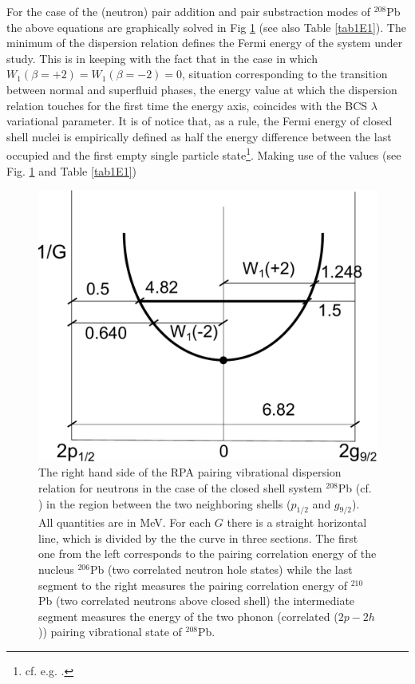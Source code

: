 For the case of the (neutron) pair addition and pair substraction modes of $^{208}$Pb the above equations are  graphically solved in Fig \ref{fig1E1} (see also Table \ref{tab1E1}). The minimum of the dispersion relation defines the Fermi energy of the system under study. This is in keeping with the fact that in the case in which $W_1 (\beta=+2)=W_1(\beta=-2)=0$, situation corresponding to the  transition between normal and superfluid phases, the energy value at which the dispersion relation touches for the first time the energy axis, coincides with the BCS $\lambda$ variational parameter. It is of notice that, as a rule, the Fermi energy of closed shell nuclei is empirically defined as half the energy difference between the last occupied and the first empty single particle state\footnote{cf. e.g. \cite{Mahaux:85}.}. Making use of the values (see Fig. \ref{fig1E1} and Table \ref{tab1E1})
  \begin{figure}
  \centerline{\includegraphics*[width=\textwidth,angle=0]{nutshell/figs/dispersion.pdf}}
  \caption{The right hand side of the RPA pairing vibrational dispersion relation for neutrons in the case of the closed shell system $^{208}$Pb (cf. \cite{Bes:66}) in the region between the two neighboring shells ($p_{1/2}$ and $g_{9/2}$). All quantities are in MeV. For each $G$ there is a straight horizontal line, which is divided by the the curve in three sections. The first one from the left corresponds to the pairing correlation energy of the nucleus $^{206}$Pb (two correlated neutron hole states) while the last segment to the right measures the pairing correlation energy of $^{210}$Pb (two correlated neutrons above closed shell) the intermediate segment measures the energy of the two phonon (correlated ($2p-2h$)) pairing vibrational state  of $^{208}$Pb.}\label{fig1E1}
  \end{figure}
